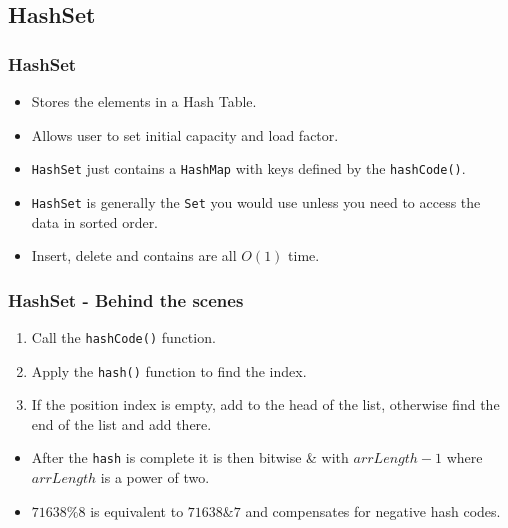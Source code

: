 \documentclass{beamer}
\begin{document}
\subsection{HashSet}
\begin{frame}
\frametitle{HashSet}
\begin{itemize}
\item Stores the elements in a Hash Table.
\item Allows user to set initial {\color{red} capacity} and {\color{green} load factor}.
\item \texttt{HashSet} just contains a \texttt{HashMap} with keys defined by the \texttt{hashCode()}.
\item \texttt{HashSet} is generally the \texttt{Set} you would use unless you need to access the data in sorted order.
\item Insert, delete and contains are all $O(1)$ time.
\end{itemize}
\end{frame}
\begin{frame}
\frametitle{HashSet - Behind the scenes}
\begin{enumerate}
\item Call the \texttt{hashCode()} function.
\item Apply the \texttt{hash()} function to find the index.
\item If the position index is empty, add to the head of the list, otherwise find the end of the list and add there.
\end{enumerate}
\begin{itemize}
\item After the \texttt{hash} is complete it is then bitwise \& with $arrLength - 1$ where $arrLength$ is a power of two. 
\item $71638\%8$ is equivalent to $71638\&7$ and compensates for negative hash codes.
\end{itemize}
\end{frame}
\end{document}
